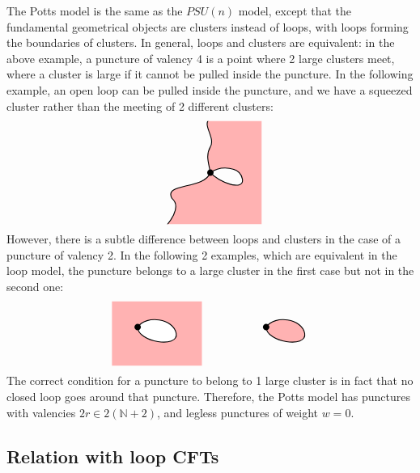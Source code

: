 \documentclass[12pt, a4paper]{article}
\begin{document}
The Potts model is the same as the $PSU(n)$ model, except that the fundamental geometrical objects are clusters instead of loops, with loops forming the boundaries of clusters. In general, loops and clusters are equivalent: in the above example, a puncture of valency 4 is a point where 2 large clusters meet, where a cluster is large if it cannot be pulled inside the puncture. In the following example, an open loop can be pulled inside the puncture, and we have a squeezed cluster rather than the meeting of 2 different clusters:
\begin{align}
 \begin{tikzpicture}[baseline=(current  bounding  box.center), scale = .4]
  \clip (-4, -4) rectangle (4, 4);
  \filldraw[thick, fill = red!30] (0, 0) to [out = 100, in = -120] (0, 2) to [out = 60, in = -150] (0, 4.2) -- (4.2, 4.2) -- (4.2, -4.2) -- (-3.5, -4.2) to [out = 50, in = -40] (-3, -2) to [out = 120, in = -110] (0, 0) to [out = -50, in = -80] (2.5, -.5) to [out = 100, in = 35] (0, 0);
   \draw (0, 0) node[fill, circle, minimum size = 2mm, inner sep = 0]{};
 \end{tikzpicture}
\end{align}
However, there is a subtle difference between loops and clusters in the case of a puncture of valency 2. In the following 2 examples, which are equivalent in the loop model, the puncture belongs to a large cluster in the first case but not in the second one: 
\begin{align}
 \begin{tikzpicture}[baseline=(current  bounding  box.center), scale = .4]
  \fill[red!30] (-2, -3) rectangle (5, 2);
  \filldraw[thick, fill = white] (0, 0) to [out = -90, in = -80] (3, -.5) to [out = 100, in = 55] (0, 0);
   \draw (0, 0) node[fill, circle, minimum size = 2mm, inner sep = 0]{};
   \filldraw[thick, fill = red!30] (10, 0) to [out = -90, in = -80] (13, -.5) to [out = 100, in = 55] (10, 0);
   \draw (10, 0) node[fill, circle, minimum size = 2mm, inner sep = 0]{};
 \end{tikzpicture}
\end{align}
The correct condition for a puncture to belong to 1 large cluster is in fact that no closed loop goes around that puncture. 
Therefore, the Potts model has punctures with valencies $2r\in 2(\mathbb{N}+2)$, and legless punctures of weight $w=0$.


\subsection{Relation with loop CFTs}
\end{document}
